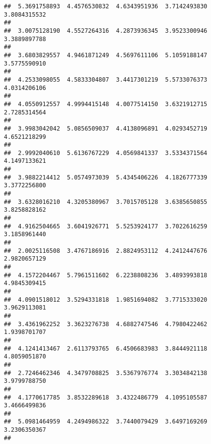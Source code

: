 \documentclass[]{article}
\begin{document}
\begin{verbatim}
##  5.3691758893  4.4576530832  4.6343951936  3.7142493830  3.8084315532 
##                                                                       
##  3.0075128190  4.5527264316  4.2873936345  3.9523300946  3.3889897788 
##                                                                       
##  3.6803829557  4.9461871249  4.5697611106  5.1059188147  3.5775590910 
##                                                                       
##  4.2533098055  4.5833304807  3.4417301219  5.5733076373  4.0314206106 
##                                                                       
##  4.0550912557  4.9994415148  4.0077514150  3.6321912715  2.7285314564 
##                                                                       
##  3.9983042042  5.0856509037  4.4138096891  4.0293452719  4.6521218299 
##                                                                       
##  2.9992040610  5.6136767229  4.0569841337  3.5334371564  4.1497133621 
##                                                                       
##  3.9882214412  5.0574973039  5.4345406226  4.1826777339  3.3772256800 
##                                                                       
##  3.6328016210  4.3205380967  3.7015705128  3.6385650855  3.8258828162 
##                                                                       
##  4.9162504665  3.6041926771  5.5253924177  3.7022616259  3.1858961440 
##                                                                       
##  2.0025116508  3.4767186916  2.8824953112  4.2412447676  2.9820657129 
##                                                                       
##  4.1572204467  5.7961511602  6.2238808236  3.4893993818  4.9845309415 
##                                                                       
##  4.0901518012  3.5294331818  1.9851694082  3.7715333020  3.9629113081 
##                                                                       
##  3.4361962252  3.3623276738  4.6882747546  4.7980422462  1.9398701707 
##                                                                       
##  4.1241413467  2.6113793765  6.4506683983  3.8444921118  4.8059051870 
##                                                                       
##  2.7246462346  4.3479708825  3.5367976774  3.3034842138  3.9799788750 
##                                                                       
##  4.1770617785  3.8532289618  3.4322486779  4.1095105587  3.4666499836 
##                                                                       
##  5.0981464959  4.2494986322  3.7440079429  3.6497169269  3.2306350367 
##                                                                       

\end{verbatim}
\end{document}
